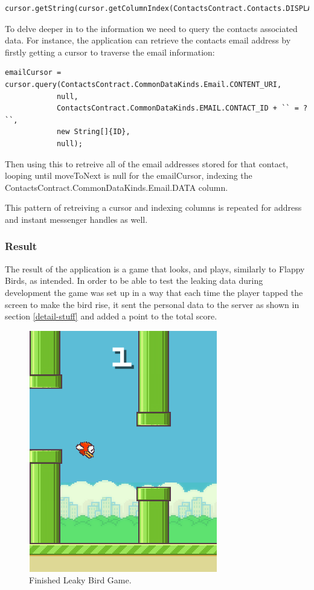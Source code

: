 \begin{verbatim}
cursor.getString(cursor.getColumnIndex(ContactsContract.Contacts.DISPLAY_NAME));
\end{verbatim}

To delve deeper in to the information we need to query the contacts associated data. For instance, the application can retrieve the contacts email address by firstly getting a cursor to traverse the email information:

\begin{verbatim}
emailCursor = cursor.query(ContactsContract.CommonDataKinds.Email.CONTENT_URI,
			null,
			ContactsContract.CommonDataKinds.EMAIL.CONTACT_ID + `` = ? ``,
			new String[]{ID},
			null); 
\end{verbatim} 

Then using this to retreive all of the email addresses stored for that contact, looping until moveToNext is null for the emailCursor, indexing the ContactsContract.CommonDataKinds.Email.DATA column.

This pattern of retreiving a cursor and indexing columns is repeated for address and instant messenger handles as well.  

\subsubsection{Result}
The result of the application is a game that looks, and plays, similarly to Flappy Birds, as intended. In order to be able to test the leaking data during development the game was set up in a way that each time the player tapped the screen to make the bird rise, it sent the personal data to the server as shown in section \ref{detail-stuff} and added a point to the total score.

\begin{figure}[h!]
\centering\includegraphics{implementation/figures/flappy-b-2.png}
\caption{Finished Leaky Bird Game.}
\end{figure}


\clearpage